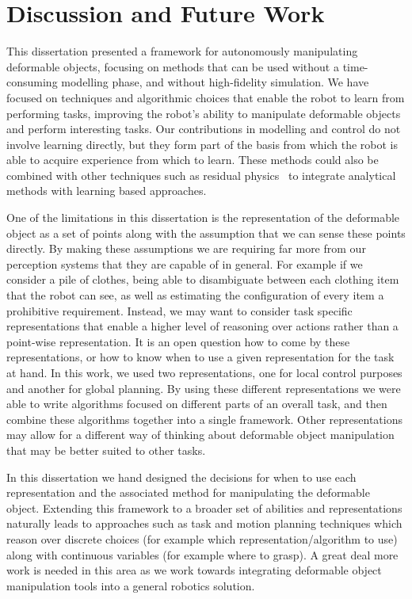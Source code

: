 \chapter{Discussion and Future Work}

This dissertation presented a framework for autonomously manipulating deformable objects, focusing on methods that can be used without a time-consuming modelling phase, and without high-fidelity simulation. We have focused on techniques and algorithmic choices that enable the robot to learn from performing tasks, improving the robot's ability to manipulate deformable objects and perform interesting tasks. Our contributions in modelling and control do not involve learning directly, but they form part of the basis from which the robot is able to acquire experience from which to learn. These methods could also be combined with other techniques such as residual physics~\cite{zengtossingbot} to integrate analytical methods with learning based approaches.

One of the limitations in this dissertation is the representation of the deformable object as a set of points along with the assumption that we can sense these points directly. By making these assumptions we are requiring far more from our perception systems that they are capable of in general. For example if we consider a pile of clothes, being able to disambiguate between each clothing item that the robot can see, as well as estimating the configuration of every item a prohibitive requirement. Instead, we may want to consider task specific representations that enable a higher level of reasoning over actions rather than a point-wise representation. It is an open question how to come by these representations, or how to know when to use a given representation for the task at hand. In this work, we used two representations, one for local control purposes and another for global planning. By using these different representations we were able to write algorithms focused on different parts of an overall task, and then combine these algorithms together into a single framework. Other representations may allow for a different way of thinking about deformable object manipulation that may be better suited to other tasks.

In this dissertation we hand designed the decisions for when to use each representation and the associated method for manipulating the deformable object. Extending this framework to a broader set of abilities and representations naturally leads to approaches such as task and motion planning techniques which reason over discrete choices (for example which representation/algorithm to use) along with continuous variables (for example where to grasp). A great deal more work is needed in this area as we work towards integrating deformable object manipulation tools into a general robotics solution.

